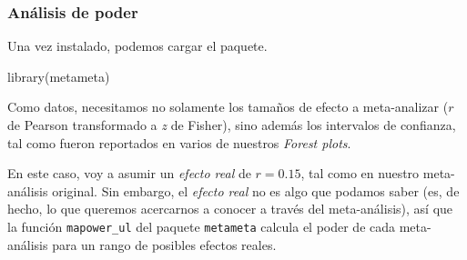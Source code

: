 \documentclass[
  bookmarksnumbered]{article}
\newenvironment{Shaded}{\begin{snugshade}}{\end{snugshade}}
\newcommand{\AttributeTok}[1]{\textcolor[rgb]{0.00,0.34,0.68}{#1}}
\newcommand{\FloatTok}[1]{\textcolor[rgb]{0.69,0.50,0.00}{#1}}
\newcommand{\FunctionTok}[1]{\textcolor[rgb]{0.39,0.29,0.61}{#1}}
\newcommand{\NormalTok}[1]{\textcolor[rgb]{0.12,0.11,0.11}{#1}}
\newcommand{\OtherTok}[1]{\textcolor[rgb]{0.00,0.43,0.16}{#1}}
\newcommand{\SpecialCharTok}[1]{\textcolor[rgb]{0.24,0.68,0.91}{#1}}
\newcommand{\StringTok}[1]{\textcolor[rgb]{0.75,0.01,0.01}{#1}}
\begin{document}
\hypertarget{anuxe1lisis-de-poder}{%
\subsubsection{Análisis de poder}\label{anuxe1lisis-de-poder}}

Una vez instalado, podemos cargar el paquete.

\begin{Shaded}
\begin{Highlighting}[]
\FunctionTok{library}\NormalTok{(metameta)}
\end{Highlighting}
\end{Shaded}

Como datos, necesitamos no solamente los tamaños de efecto a meta-analizar (\(r\) de Pearson transformado a \emph{z} de Fisher), sino además los intervalos de confianza, tal como fueron reportados en varios de nuestros \emph{Forest plots}.

En este caso, voy a asumir un \emph{efecto real} de \(r = 0.15\), tal como en nuestro meta-análisis original. Sin embargo, el \emph{efecto real} no es algo que podamos saber (es, de hecho, lo que queremos acercarnos a conocer a través del meta-análisis), así que la función \texttt{mapower\_ul} del paquete \texttt{metameta} calcula el poder de cada meta-análisis para un rango de posibles efectos reales.

\begin{Shaded}
\end{Shaded}
\end{document}
